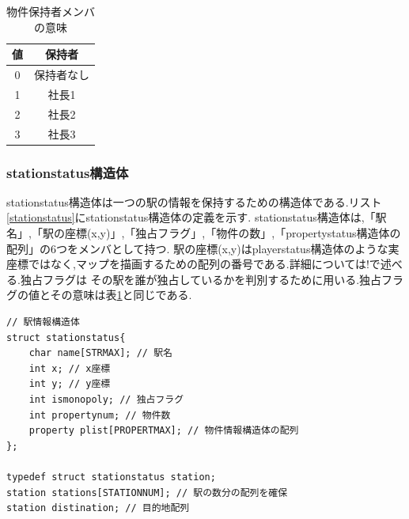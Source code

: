 \documentclass[a4j]{jarticle}
\begin{document}
    \begin{table}[H]
      \caption{物件保持者メンバの意味}
    \label{whohold}
    \begin{center}
        \begin{tabular}{c|c}\hline
        値 & 保持者 \\ \hline \hline
          0 & 保持者なし \\
          1 & 社長1 \\
          2 & 社長2 \\
          3 & 社長3 \\ \hline
        \end{tabular}
    \end{center}
    \end{table}

    \subsubsection{stationstatus構造体}
    stationstatus構造体は一つの駅の情報を保持するための構造体である.リスト\ref{stationstatus}にstationstatus構造体の定義を示す.
    stationstatus構造体は,「駅名」,「駅の座標(x,y)」,「独占フラグ」,「物件の数」,「propertystatus構造体の配列」の6つをメンバとして持つ.
    駅の座標(x,y)はplayerstatus構造体のような実座標ではなく,マップを描画するための配列の番号である.詳細については!で述べる.独占フラグは
    その駅を誰が独占しているかを判別するために用いる.独占フラグの値とその意味は表\ref{whohold}と同じである.
    \begin{lstlisting}[basicstyle=\ttfamily\footnotesize, frame=single,label=stationstatus,caption=stationstatus構造体の定義と初期化]
// 駅情報構造体
struct stationstatus{
    char name[STRMAX]; // 駅名
    int x; // x座標
    int y; // y座標
    int ismonopoly; // 独占フラグ
    int propertynum; // 物件数
    property plist[PROPERTMAX]; // 物件情報構造体の配列
};

typedef struct stationstatus station;
station stations[STATIONNUM]; // 駅の数分の配列を確保
station distination; // 目的地配列
    \end{lstlisting}    
\end{document}
